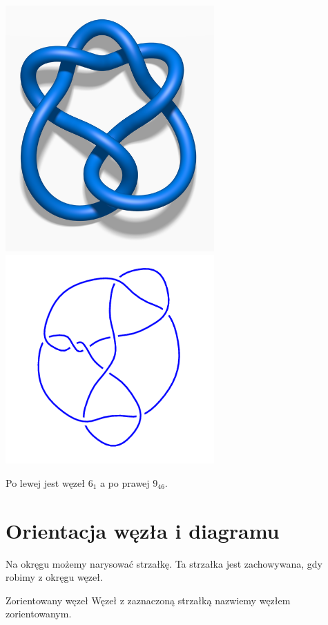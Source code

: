 \documentclass{article}
\begin{document}
\begin{center}
  \includegraphics[width=8cm]{knot_6_1.png}
  \includegraphics[width=8cm]{knot_9_46.png}

  Po lewej jest węzeł $6_1$ a po prawej $9_{46}$.
\end{center}

\section{Orientacja węzła i diagramu}

Na okręgu możemy narysować strzałkę. Ta strzałka jest zachowywana, gdy robimy z okręgu węzeł.

\begin{definition}{Zorientowany węzeł}{}
  Węzeł z zaznaczoną strzałką nazwiemy węzłem zorientowanym.
\end{definition}
\end{document}
